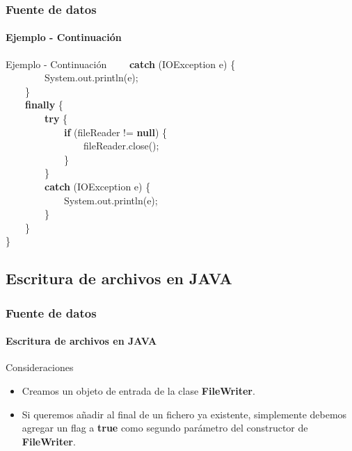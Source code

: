 \documentclass{beamer}
\begin{document}
		\begin{frame}
			\frametitle{Fuente de datos}
			\framesubtitle{Ejemplo - Continuaci\'on}

			\begin{block}{Ejemplo  - Continuaci\'on}
			{\scriptsize
				\ \ \ \ \textbf{catch} (IOException e) \{ \\
                                     \ \ \ \ \ \ \ \ System.out.println(e); \\
                                     \ \ \ \ \} \\
                                     \ \ \ \ \textbf{finally} \{ \\
                                     \ \ \ \ \ \ \ \ \textbf{try} \{ \\
                                     \ \ \ \ \ \ \ \ \ \ \ \ \textbf{if} (fileReader !=  \textbf{null}) \{ \\
                                     \ \ \ \ \ \ \ \ \ \ \ \ \ \ \ \ fileReader.close(); \\
                                     \ \ \ \ \ \ \ \ \ \ \ \ \} \\
                                     \ \ \ \ \ \ \ \ \} \\
                                     \ \ \ \ \ \ \ \ \textbf{catch} (IOException e) \{ \\
                                     \ \ \ \ \ \ \ \ \ \ \ \ System.out.println(e); \\
                                     \ \ \ \ \ \ \ \ \}\\
                                     \ \ \ \ \} \\
                                     \}
			}
			\end{block}
		\end{frame}

		\subsection{Escritura de archivos en JAVA}

		\begin{frame}
			\frametitle{Fuente de datos}
			\framesubtitle{Escritura de archivos en JAVA}

			\begin{block}{Consideraciones}
				\begin{itemize}
					\item Creamos un objeto de entrada de la clase \textbf{FileWriter}.
					\item Si queremos a\~nadir al final de un fichero ya existente, simplemente debemos agregar un flag a \textbf{true} como segundo par\'ametro del constructor de \textbf{FileWriter}.
				\end{itemize}
			\end{block}
		\end{frame}
\end{document}
